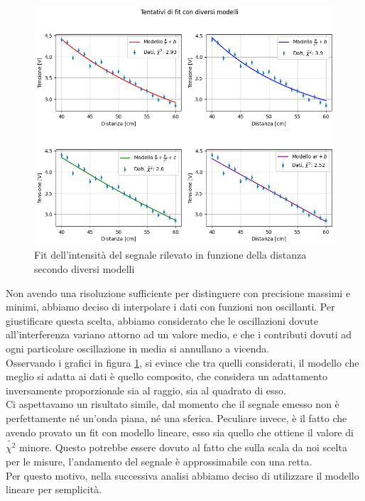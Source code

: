\documentclass[letterpaper,12pt]{article}
\begin{document}
\begin{figure}[h!]
	\centering
	\includegraphics[width = \textwidth]{fit_distanza_vari_modelli.png}
	\caption{Fit dell'intensità del segnale rilevato in funzione della distanza secondo diversi modelli}
	\label{fig:fit_distanza_vari_modelli}
\end{figure}

Non avendo una risoluzione sufficiente per distinguere con precisione massimi e minimi, abbiamo deciso di interpolare
i dati con funzioni non oscillanti. Per giustificare questa scelta, abbiamo considerato che le oscillazioni dovute all'interferenza
variano attorno ad un valore medio, e che i contributi dovuti ad ogni particolare oscillazione in media si annullano a vicenda.\\
Osservando i grafici in figura \ref{fig:fit_distanza_vari_modelli}, si evince che tra quelli considerati, il modello che meglio si adatta
ai dati è quello composito, che considera un adattamento inversamente proporzionale sia al raggio, sia al quadrato di esso.\\
Ci aspettavamo un risultato simile, dal momento che il segnale emesso non è perfettamente né un'onda piana, né una sferica. Peculiare invece,
è il fatto che avendo provato un fit con modello lineare, esso sia quello che ottiene il valore di $\tilde{\chi^2}$ minore. Questo potrebbe essere dovuto al fatto
che sulla scala da noi scelta per le misure, l'andamento del segnale è approssimabile con una retta.\\
Per questo motivo, nella successiva analisi abbiamo deciso di utilizzare il modello lineare per semplicità.\\
\end{document}
